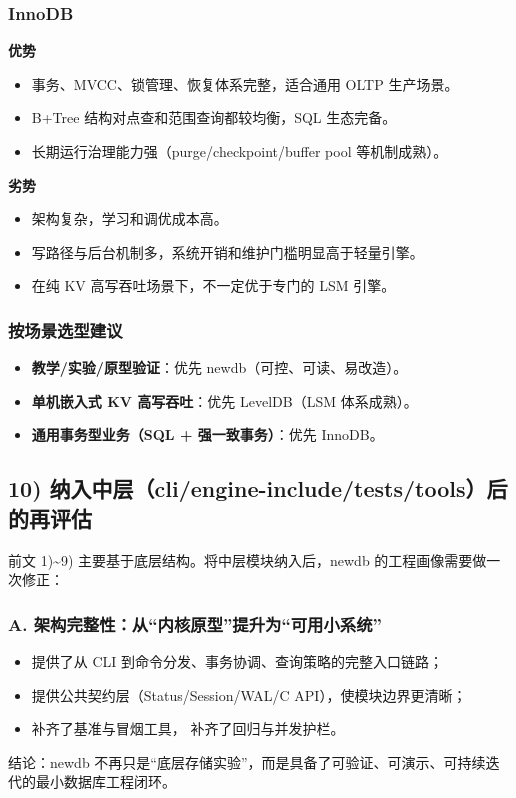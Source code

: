 \subsubsection{InnoDB}
\textbf{优势}
\begin{itemize}
  \item 事务、MVCC、锁管理、恢复体系完整，适合通用 OLTP 生产场景。
  \item B+Tree 结构对点查和范围查询都较均衡，SQL 生态完备。
  \item 长期运行治理能力强（purge/checkpoint/buffer pool 等机制成熟）。
\end{itemize}
\textbf{劣势}
\begin{itemize}
  \item 架构复杂，学习和调优成本高。
  \item 写路径与后台机制多，系统开销和维护门槛明显高于轻量引擎。
  \item 在纯 KV 高写吞吐场景下，不一定优于专门的 LSM 引擎。
\end{itemize}

\subsubsection{按场景选型建议}
\begin{itemize}
  \item \textbf{教学/实验/原型验证}：优先 newdb（可控、可读、易改造）。
  \item \textbf{单机嵌入式 KV 高写吞吐}：优先 LevelDB（LSM 体系成熟）。
  \item \textbf{通用事务型业务（SQL + 强一致事务）}：优先 InnoDB。
\end{itemize}

\subsection{10) 纳入中层（cli/engine-include/tests/tools）后的再评估}

前文 1)\textasciitilde9) 主要基于底层结构。将中层模块纳入后，newdb 的工程画像需要做一次修正：

\subsubsection{A. 架构完整性：从“内核原型”提升为“可用小系统”}
\begin{itemize}
  \item {} 提供了从 CLI 到命令分发、事务协调、查询策略的完整入口链路；
  \item {} 提供公共契约层（Status/Session/WAL/C API），使模块边界更清晰；
  \item {} 补齐了基准与冒烟工具， 补齐了回归与并发护栏。
\end{itemize}
结论：newdb 不再只是“底层存储实验”，而是具备了可验证、可演示、可持续迭代的最小数据库工程闭环。

